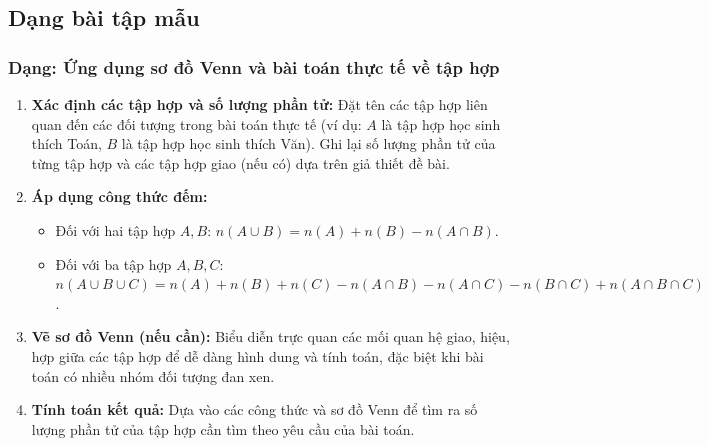 

\subsection{Dạng bài tập mẫu}

\subsubsection{Dạng: Ứng dụng sơ đồ Venn và bài toán thực tế về tập hợp}
\begin{phuongphap}
\begin{enumerate}
\item \textbf{Xác định các tập hợp và số lượng phần tử:} Đặt tên các tập hợp liên quan đến các đối tượng trong bài toán thực tế (ví dụ: $A$ là tập hợp học sinh thích Toán, $B$ là tập hợp học sinh thích Văn). Ghi lại số lượng phần tử của từng tập hợp và các tập hợp giao (nếu có) dựa trên giả thiết đề bài.
\item \textbf{Áp dụng công thức đếm:}
\begin{itemize}
    \item Đối với hai tập hợp $A, B$: $n(A \cup B) = n(A) + n(B) - n(A \cap B)$.
    \item Đối với ba tập hợp $A, B, C$: $n(A \cup B \cup C) = n(A) + n(B) + n(C) - n(A \cap B) - n(A \cap C) - n(B \cap C) + n(A \cap B \cap C)$.
\end{itemize}
\item \textbf{Vẽ sơ đồ Venn (nếu cần):} Biểu diễn trực quan các mối quan hệ giao, hiệu, hợp giữa các tập hợp để dễ dàng hình dung và tính toán, đặc biệt khi bài toán có nhiều nhóm đối tượng đan xen.
\item \textbf{Tính toán kết quả:} Dựa vào các công thức và sơ đồ Venn để tìm ra số lượng phần tử của tập hợp cần tìm theo yêu cầu của bài toán.
\end{enumerate}
\end{phuongphap}

